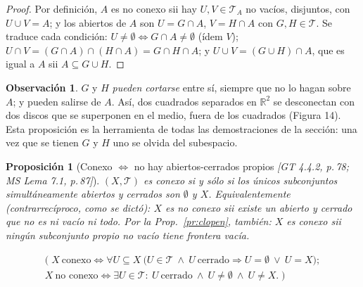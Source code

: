 \documentclass[11pt,a4paper]{article}
\newcommand{\lgc}[1]{\par\vspace{-3pt}\begin{gather*}\big(\;#1\;\big)\end{gather*}\vspace{-6pt}}
\newcommand{\figtit}[1]{\par\vspace{2pt}{\footnotesize\itshape #1}\par}
\theoremstyle{definition}
\newtheorem{observacion}[definicion]{Observación}
\theoremstyle{plain}
\newtheorem{proposicion}[definicion]{Proposición}
\newcommand{\fnt}[1]{{\normalfont\small\itshape\color{gray!150!black}[#1]}}
\newcommand{\R}{\mathbb{R}}
\newcommand{\tp}{\mathcal{T}}
\begin{document}
\begin{proof}
Por definición, $A$ es no conexo sii hay $U,V\in\tp_A$ no vacíos, disjuntos, con $U\cup V=A$; y los abiertos de $A$ son $U=G\cap A$, $V=H\cap A$ con $G,H\in\tp$. Se traduce cada condición: $U\ne\emptyset\iff G\cap A\ne\emptyset$ (ídem $V$); $U\cap V=(G\cap A)\cap(H\cap A)=G\cap H\cap A$; y $U\cup V=(G\cup H)\cap A$, que es igual a $A$ sii $A\subseteq G\cup H$.
\end{proof}

\begin{observacion}
$G$ y $H$ \emph{pueden cortarse} entre sí, siempre que no lo hagan sobre $A$; y pueden salirse de $A$. Así, dos cuadrados separados en $\R^2$ se desconectan con dos discos que se superponen en el medio, fuera de los cuadrados (Figura 14). Esta proposición es la herramienta de todas las demostraciones de la sección: una vez que se tienen $G$ y $H$ uno se olvida del subespacio.
\end{observacion}

\begin{figure}[ht]
\centering
{}
\figtit{Figura 14. La desconexión con abiertos del espacio grande: $G$ y $H$ se superponen en el medio, pero no sobre $A$; cada uno se lleva un cuadrado y entre los dos cubren $A$.}
\end{figure}

\begin{proposicion}[Conexo $\iff$ no hay abiertos-cerrados propios \fnt{GT 4.4.2, p.\,78; MS Lema 7.1, p.\,87}]\label{pr:conexclopen}
$(X,\tp)$ es conexo si y sólo si los únicos subconjuntos simultáneamente abiertos y cerrados son $\emptyset$ y $X$. Equivalentemente (contrarrecíproco, como se dictó): $X$ es no conexo sii existe un abierto y cerrado que no es ni vacío ni todo. Por la Prop.~\ref{pr:clopen}, también: $X$ es conexo sii ningún subconjunto propio no vacío tiene frontera vacía.
\lgc{X\ \text{conexo}\iff \forall U\subseteq X\ \big(U\in\tp\ \wedge\ U\ \text{cerrado}\Rightarrow U=\emptyset\ \vee\ U=X\big);\\
X\ \text{no conexo}\iff \exists U\in\tp:\ U\ \text{cerrado}\ \wedge\ U\ne\emptyset\ \wedge\ U\ne X.}
\end{proposicion}
\end{document}
